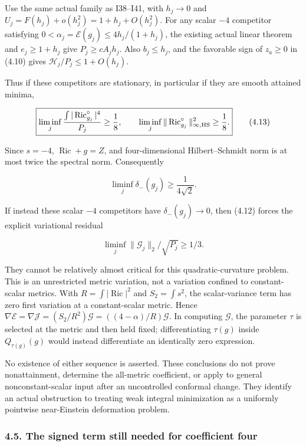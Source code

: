 \documentclass[
  10pt,
]{article}
\begin{document}
Use the same actual family as I38--I41, with \(h_j\to0\) and
\(U_j=F(h_j)+o(h_j^2)=1+h_j+O(h_j^2)\). For any scalar \(-4\) competitor
satisfying \(0<\alpha_j=\mathcal E(g_j)\le4h_j/(1+h_j)\), the existing
actual linear theorem and \(e_j\ge1+h_j\) give \(P_j\ge cA_jh_j\). Also
\(b_j\le h_j\), and the favorable sign of \(z_a\ge0\) in (4.10) gives
\(\mathcal H_j/P_j\le1+O(h_j)\).

Thus if these competitors are stationary, in particular if they are
smooth attained minima,

\[
 \boxed{
 \liminf_j\frac{\int|\operatorname{Ric}^{\circ}_{g_j}|^4}{P_j}\ge\frac18,
 \qquad
 \liminf_j\|\operatorname{Ric}^{\circ}_{g_j}\|_{\infty,\rm HS}^2\ge\frac18.}
                                                        \tag{4.13}
\]

Since \(s=-4\), \(\operatorname{Ric}+g=Z\), and four-dimensional
Hilbert--Schmidt norm is at most twice the spectral norm. Consequently

\[
                         \liminf_j\delta_-(g_j)\ge\frac1{4\sqrt2}.
                                                        \tag{4.14}
\]

If instead these scalar \(-4\) competitors have \(\delta_-(g_j)\to0\),
then (4.12) forces the explicit variational residual

\[
                   \boxed{\liminf_j
                       \|\mathcal G_j\|_2/\sqrt{P_j}\ge1/3.}   \tag{4.15}
\]

They cannot be relatively almost critical for this quadratic-curvature
problem. This is an unrestricted metric variation, not a variation
confined to constant-scalar metrics. With
\(R=\int|\operatorname{Ric}|^2\) and \(S_2=\int s^2\), the
scalar-variance term has zero first variation at a constant-scalar
metric. Hence
\(\nabla\mathcal E=\nabla\mathcal J=(S_2/R^2)\mathcal G =((4-\alpha)/R)\mathcal G\).
In computing \(\mathcal G\), the parameter \(\tau\) is selected at the
metric and then held fixed; differentiating \(\tau(g)\) inside
\(Q_{\tau(g)}(g)\) would instead differentiate an identically zero
expression.

No existence of either sequence is asserted. These conclusions do not
prove nonattainment, determine the all-metric coefficient, or apply to
general nonconstant-scalar input after an uncontrolled conformal change.
They identify an actual obstruction to treating weak integral
minimization as a uniformly pointwise near-Einstein deformation problem.

\hypertarget{the-signed-term-still-needed-for-coefficient-four}{%
\subsubsection{4.5. The signed term still needed for coefficient
four}\label{the-signed-term-still-needed-for-coefficient-four}}
\end{document}

